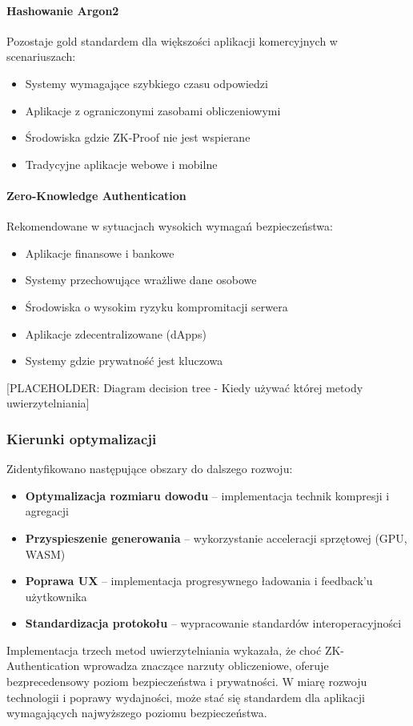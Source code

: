 \documentclass{article}
\begin{document}
\paragraph{Hashowanie Argon2}
Pozostaje gold standardem dla większości aplikacji komercyjnych w scenariuszach:
\begin{itemize}
    \item Systemy wymagające szybkiego czasu odpowiedzi
    \item Aplikacje z ograniczonymi zasobami obliczeniowymi
    \item Środowiska gdzie ZK-Proof nie jest wspierane
    \item Tradycyjne aplikacje webowe i mobilne
\end{itemize}

\paragraph{Zero-Knowledge Authentication}
Rekomendowane w sytuacjach wysokich wymagań bezpieczeństwa:
\begin{itemize}
    \item Aplikacje finansowe i bankowe
    \item Systemy przechowujące wrażliwe dane osobowe
    \item Środowiska o wysokim ryzyku kompromitacji serwera
    \item Aplikacje zdecentralizowane (dApps)
    \item Systemy gdzie prywatność jest kluczowa
\end{itemize}

[PLACEHOLDER: Diagram decision tree - Kiedy używać której metody uwierzytelniania]

\subsubsection{Kierunki optymalizacji}
Zidentyfikowano następujące obszary do dalszego rozwoju:
\begin{itemize}
    \item \textbf{Optymalizacja rozmiaru dowodu} – implementacja technik kompresji i agregacji
    \item \textbf{Przyspieszenie generowania} – wykorzystanie acceleracji sprzętowej (GPU, WASM)
    \item \textbf{Poprawa UX} – implementacja progresywnego ładowania i feedback'u użytkownika
    \item \textbf{Standardizacja protokołu} – wypracowanie standardów interoperacyjności
\end{itemize}

Implementacja trzech metod uwierzytelniania wykazała, że choć ZK-Authentication wprowadza znaczące narzuty obliczeniowe, oferuje bezprecedensowy poziom bezpieczeństwa i prywatności. W miarę rozwoju technologii i poprawy wydajności, może stać się standardem dla aplikacji wymagających najwyższego poziomu bezpieczeństwa.

  

\end{document}
